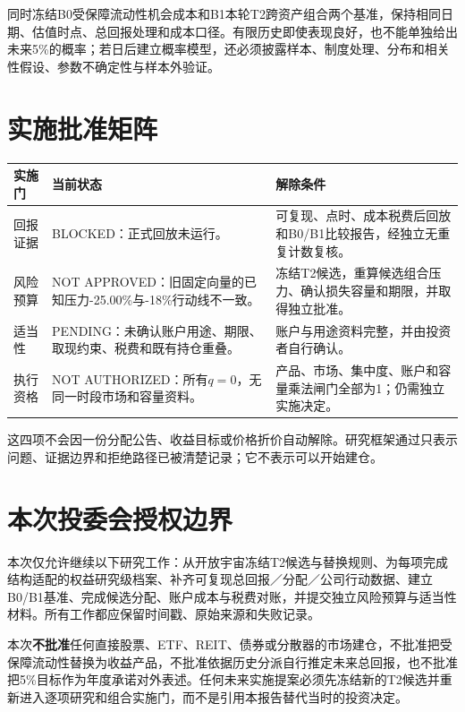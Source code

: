 同时冻结B0受保障流动性机会成本和B1本轮T2跨资产组合两个基准，保持相同日期、估值时点、总回报处理和成本口径。有限历史即使表现良好，也不能单独给出未来5\%的概率；若日后建立概率模型，还必须披露样本、制度处理、分布和相关性假设、参数不确定性与样本外验证。

\section{实施批准矩阵}

\begin{exhibitbox}[四项实施门均为阻断状态]
\small
\begin{tabularx}{\exhibitboxwidth}{L{3.1cm}P P}
\toprule
\textbf{实施门} & \textbf{当前状态} & \textbf{解除条件} \\
\midrule
回报证据 & BLOCKED：正式回放未运行。 & 可复现、点时、成本税费后回放和B0/B1比较报告，经独立无重复计数复核。 \\
风险预算 & NOT APPROVED：旧固定向量的已知压力-25.00\%与-18\%行动线不一致。 & 冻结T2候选，重算候选组合压力、确认损失容量和期限，并取得独立批准。 \\
适当性 & PENDING：未确认账户用途、期限、取现约束、税费和既有持仓重叠。 & 账户与用途资料完整，并由投资者自行确认。 \\
执行资格 & NOT AUTHORIZED：所有$q=0$，无同一时段市场和容量资料。 & 产品、市场、集中度、账户和容量乘法闸门全部为1；仍需独立实施决定。 \\
\bottomrule
\end{tabularx}
\end{exhibitbox}

这四项不会因一份分配公告、收益目标或价格折价自动解除。研究框架通过只表示问题、证据边界和拒绝路径已被清楚记录；它不表示可以开始建仓。

\section{本次投委会授权边界}

本次仅允许继续以下研究工作：从开放宇宙冻结T2候选与替换规则、为每项完成结构适配的权益研究级档案、补齐可复现总回报／分配／公司行动数据、建立B0/B1基准、完成候选分配、账户成本与税费对账，并提交独立风险预算与适当性材料。所有工作都应保留时间戳、原始来源和失败记录。

本次\textbf{不批准}任何直接股票、ETF、REIT、债券或分散器的市场建仓，不批准把受保障流动性替换为收益产品，不批准依据历史分派自行推定未来总回报，也不批准把5\%目标作为年度承诺对外表述。任何未来实施提案必须先冻结新的T2候选并重新进入逐项研究和组合实施门，而不是引用本报告替代当时的投资决定。

